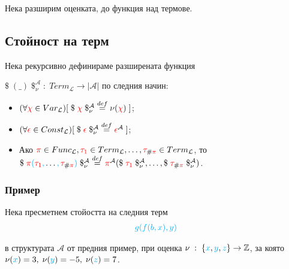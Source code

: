\documentclass{article}[12pt]
\newcommand{\Lang}{\mathcal{L}}
\begin{document}
\vspace{0.3cm}

Нека разширим оценката, до функция над термове.

\subsection{Стойност на терм}

Нека рекурсивно дефинираме разширената функция

\(\$ \; (\_) \; \$^{\mathcal{A}}_\nu \; : \; Term_\Lang \to |\mathcal{A}|\)
по следния начин:

\begin{itemize}
\item \((\forall \color{red} \chi \color{black} \in Var_\Lang)[\; \$ \; \color{red} \chi \color{black} \; \$^{\mathcal{A}}_\nu \overset{def}{=} \nu(\color{red} \chi \color{black}) \; ]\);
\item \((\forall \color{red} \epsilon \color{black} \in Const_\Lang)[\; \$ \; \color{red} \epsilon \color{black} \; \$^{\mathcal{A}}_\nu \overset{def}{=} \color{red} \epsilon \color{black}^{\mathcal{A}} \; ]\);
\item Ако \(\color{red} \pi \color{black} \in Func_\Lang, \color{red}  \tau_1 \color{black} \in Term_\Lang, \dots, \color{red} \tau_{\color{black} \# \color{red} \pi} \color{black} \in Term_\Lang\), то \\
\(\$ \; \color{red} \pi  \color{cyan} ( \color{red} \tau_1 \color{cyan} , \color{black} \dots \color{cyan} , \color{red} \tau_{\color{black} \# \color{red} \pi} \color{cyan} ) \color{black} \; \$^{\mathcal{A}}_\nu \overset{def}{=} \color{red} \pi \color{black}^{\mathcal{A}}( \$ \; \color{red} \tau_1 \color{black} \; \$^{\mathcal{A}}_\nu, \dots , \$ \; \color{red} \tau_{\color{black} \# \color{red} \pi} \color{black} \; \$^{\mathcal{A}}_\nu  )\).
\end{itemize}

\subsubsection{Пример}
Нека пресметнем стойостта на следния терм
\begin{align*}
\color{cyan} g(f(b, x), y)
\end{align*}

в структурата \(\mathcal{A}\) от предния пример,
при оценка \(\nu \; : \; \{\color{cyan} x \color{black}, \color{cyan} y \color{black} , \color{cyan} z \color{black} \} \to \mathbb{Z}\),
за която \(\nu(\color{cyan} x \color{black}) = 3, \; \nu(\color{cyan} y \color{black}) = -5, \; \nu(\color{cyan} z \color{black}) = 7\).
\end{document}
